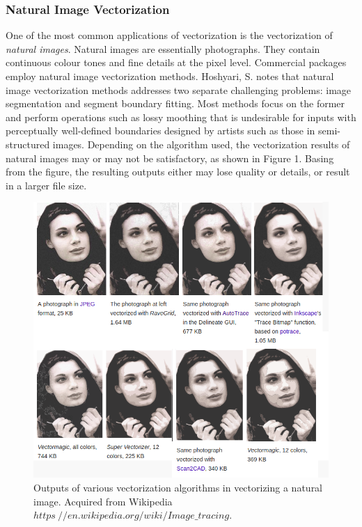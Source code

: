 \documentclass[12pt]{article}
\begin{document}
\subsubsection{Natural Image Vectorization}
One of the most common applications of vectorization is the vectorization of \textit{natural images}. Natural images are essentially photographs. They contain continuous colour tones and fine details at the pixel level. Commercial packages employ natural image vectorization methods. Hoshyari, S. \cite{hoshyari2018perceptiondriven} notes that natural image vectorization methods addresses two separate challenging problems: image segmentation and segment boundary fitting. Most methods focus on the former and perform operations such as lossy moothing that is undesirable for inputs with perceptually well-defined boundaries designed by artists such as those in semi-structured images. Depending on the algorithm used, the vectorization results of natural images may or may not be satisfactory, as shown in Figure 1. Basing from the figure, the resulting outputs either may lose quality or details, or result in a larger file size.

\begin{figure}[h]
\centering
\includegraphics[scale=2.0]{images/natural-vectorization.png}
\caption{Outputs of various vectorization algorithms in vectorizing a natural image. Acquired from Wikipedia \(https\://en.wikipedia.org/wiki/Image\_tracing\).}
\label{fig:natural-vectorization}
\end{figure}
\end{document}

